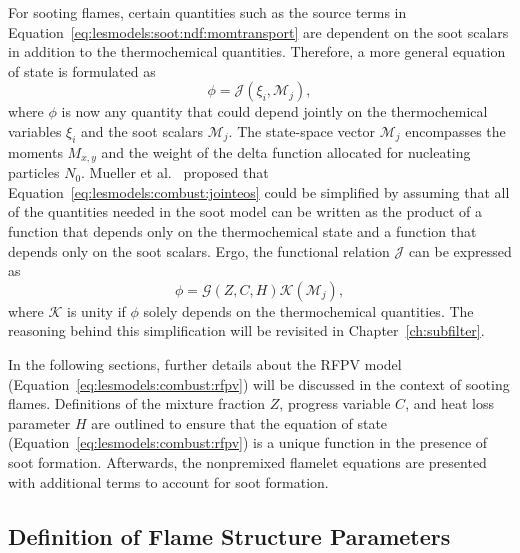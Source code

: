 For sooting flames, certain quantities such as the source terms in Equation~\ref{eq:lesmodels:soot:ndf:momtransport} are dependent on the soot scalars in addition to the thermochemical quantities. Therefore, a more general equation of state is formulated as
\begin{equation}\label{eq:lesmodels:combust:jointeos}
  \phi = \mathcal{J}(\xi_i, \mathcal{M}_j),
\end{equation}
where $\phi$ is now any quantity that could depend jointly on the thermochemical variables $\xi_i$ and the soot scalars $\mathcal{M}_j$. The state-space vector $\mathcal{M}_j$ encompasses the moments $M_{x,y}$ and the weight of the delta function allocated for nucleating particles $N_0$. Mueller et al.~\cite{subfilterpdf2011} proposed that Equation~\ref{eq:lesmodels:combust:jointeos} could be simplified by assuming that all of the quantities needed in the soot model can be written as the product of a function that depends only on the thermochemical state and a function that depends only on the soot scalars. Ergo, the functional relation $\mathcal{J}$ can be expressed as
\begin{equation}\label{eq:lesmodels:combust:producteos}
  \phi = \mathcal{G}(Z, C, H)\mathcal{K}(\mathcal{M}_j),
\end{equation}
where $\mathcal{K}$ is unity if $\phi$ solely depends on the thermochemical quantities. The reasoning behind this simplification will be revisited in Chapter~\ref{ch:subfilter}.

In the following sections, further details about the RFPV model (Equation~\ref{eq:lesmodels:combust:rfpv}) will be discussed in the context of sooting flames. Definitions of the mixture fraction $Z$, progress variable $C$, and heat loss parameter $H$ are outlined to ensure that the equation of state (Equation~\ref{eq:lesmodels:combust:rfpv}) is a unique function in the presence of soot formation. Afterwards, the nonpremixed flamelet equations are presented with additional terms to account for soot formation.


\subsection{Definition of Flame Structure Parameters}
\label{sec:lesmodels:combust:map}

